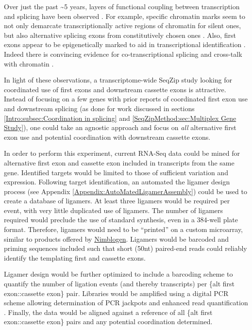     Over just the past \textasciitilde5 years, layers of functional coupling between transcription and splicing have been observed \citep{Merkhofer2014}. For example, specific chromatin marks seem to not only demarcate transcriptionally active regions of chromatin for silent ones, but also alternative splicing exons from constitutively chosen ones \citep{Kolasinska-Zwierz2009}. Also, first exons appear to be epigenetically marked to aid in transcriptional identification \citep{Bieberstein2012}. Indeed there is convincing evidence for co-transcriptional splicing and cross-talk with chromatin \citep{Brown2012,Luco2011a,Schwartz2010}.

    In light of these observations, a transcriptome-wide SeqZip study looking for coordinated use of first exons and downstream cassette exons is attractive. Instead of focusing on a few genes with prior reports of coordinated first exon use and downstream splicing (as done for work discussed in sections \ref{Intro:subsec:Coordination in splicing} and \ref{SeqZipMethod:sec:Multiplex Gene Study}), one could take an agnostic approach and focus on \textit{all} alternative first exon use and potential coordination with downstream cassette exons.

    In order to perform this experiment, current RNA-Seq data could be mined for alternative first exon and cassette exon included in transcripts from the same gene. Identified targets would be limited to those of sufficient variation and expression. Following target identification, an automated the ligamer design process (see Appendix \ref{Appendix:AutoMatedLigamerAssembly}) could be used to create a database of ligamers. At least three ligamers would be required per event, with very little duplicated use of ligamers. The number of ligamers required would preclude the use of standard synthesis, even in a 384-well plate format. Therefore, ligamers would need to be ``printed'' on a custom microarray, similar to products offered by \href{http://www.nimblegen.com/}{Nimblogen}. Ligamers would be barcoded and priming sequences included such that short (50nt) paired-end reads could reliably identify the templating first and cassette exons.

    Ligamer design would be further optimized to include a barcoding scheme to quantify the number of ligation events (and thereby transcripts) per \{alt first exon::cassette exon\} pair. Libraries would be amplified using a digital PCR scheme allowing determination of PCR jackpots and enhanced read quantification \citep{Shiroguchi2012a}. Finally, the data would be aligned against a reference of all \{alt first exon::cassette exon\} pairs and any potential coordination determined.

